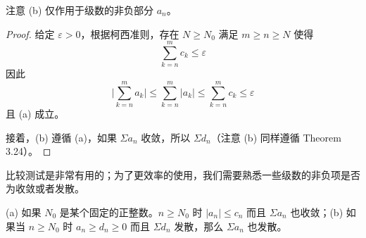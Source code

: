 \documentclass[../poma-notes.tex]{subfiles}
\begin{document}
注意 (b) 仅作用于级数的非负部分 $a_n$。

\begin{proof}
  给定 $\varepsilon > 0$，根据柯西准则，存在 $N \ge N_0$ 满足 $m \ge n \ge N$ 使得
  \[ \sum_{k=n}^{m} c_k \le \varepsilon \]
  因此
  \[ \Bigg| \sum_{k=n}^{m} a_k \Bigg| \le \sum_{k=n}^{m} |a_k| \le \sum_{k=n}^{m} c_k \le \varepsilon \]
  且 (a) 成立。

  接着，(b) 遵循 (a)，如果 $\Sigma a_n$ 收敛，所以 $\Sigma d_n$（注意 (b) 同样遵循 Theorem 3.24）。
\end{proof}

比较测试是非常有用的；为了更效率的使用，我们需要熟悉一些级数的非负项是否为收敛或者发散。

\anote (a) 如果 $N_0$ 是某个固定的正整数。$n \ge N_0$ 时 $|a_n| \le c_n$ 而且 $\Sigma a_n$ 也收敛；(b) 如果当 $n \ge N_0$ 时
$a_n \ge d_n \ge 0$ 而且 $\Sigma d_n$ 发散，那么 $\Sigma a_n$ 也发散。
\end{document}
